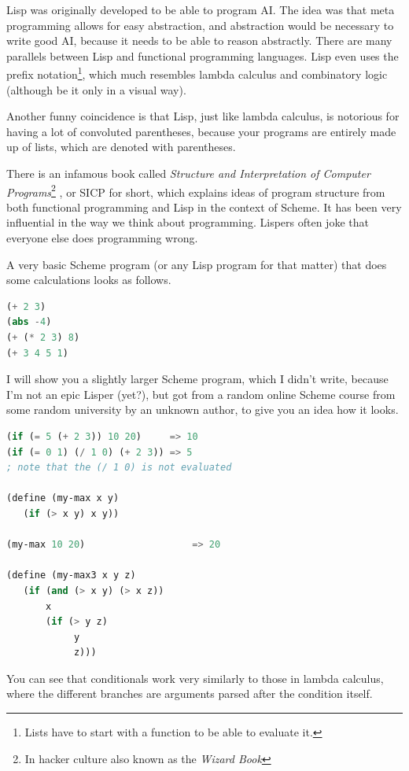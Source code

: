 \documentclass[11pt]{article}
\begin{document}
Lisp was originally developed to be able to program AI. The idea was that meta
programming allows for easy abstraction, and abstraction would be necessary to
write good AI, because it needs to be able to reason abstractly. There are many
parallels between Lisp and functional programming languages. Lisp even uses the
prefix notation\footnote{Lists have to start with a function to be able to
evaluate it.}, which much resembles lambda calculus and combinatory logic
(although be it only in a visual way).

Another funny coincidence is that Lisp, just like lambda calculus, is notorious
for having a lot of convoluted parentheses, because your programs are entirely
made up of lists, which are denoted with parentheses.

There is an infamous book called \emph{Structure and Interpretation of Computer
Programs}\footnote{In hacker culture also known as the \emph{Wizard Book}}
\parencite{sicp}, or SICP for short, which explains ideas of program structure
from both functional programming and Lisp in the context of Scheme. It has been
very influential in the way we think about programming. Lispers often joke that
everyone else does programming wrong.

A very basic Scheme program (or any Lisp program for that matter) that does
some calculations looks as follows.

\begin{lstlisting}[language=Lisp]
(+ 2 3)
(abs -4)
(+ (* 2 3) 8)
(+ 3 4 5 1)
\end{lstlisting}

I will show you a slightly larger Scheme program, which I didn't write, because
I'm not an epic Lisper (yet?), but got from a random online Scheme course from
some random university by an unknown author, to give you an idea how it looks.

\begin{lstlisting}[language=Lisp]
(if (= 5 (+ 2 3)) 10 20)     => 10 
(if (= 0 1) (/ 1 0) (+ 2 3)) => 5  
; note that the (/ 1 0) is not evaluated

(define (my-max x y)     
   (if (> x y) x y))    

(my-max 10 20)                   => 20 

(define (my-max3 x y z)
   (if (and (> x y) (> x z))
       x
       (if (> y z) 
            y
            z)))
\end{lstlisting}

You can see that conditionals work very similarly to those in lambda calculus,
where the different branches are arguments parsed after the condition itself.
\end{document}
